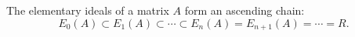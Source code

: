 The elementary ideals of a matrix $A$ form an ascending chain:
$$E_0(A) \subset E_1(A) \subset \cdots \subset E_n(A) = E_{n+1}(A) = \cdots = R.$$
